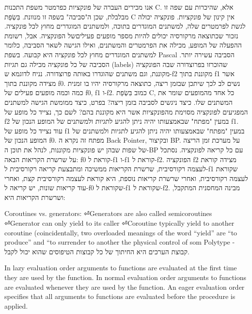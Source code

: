 \begin{טבלא}[!htbp]
        אנו מכירים העברה של פונקציות כפרמטר משפת התכנות C. אלא, שהיכרות עם שפה זו
        מבלבלת, שכן ה"סביבה" בשפה זו מנוונת. בִּשְׂפַת C אין קינון של פונקציות. פונקציה
        יכולה לגשת לפרמטרים שלה, למשתנים המוגדרים בתוכה, ולמשתנים המוגדרים מחוץ לכל
        פונקציה. נזכור שכתוצאה מרקורסיה יכולים להיות מספר מופעים פעיליםשל הפונקציה.
        אבל, רשומת ההפעלה של המופע, מכילה את הפרמטרים והמשתנים, ואילו הגישה לשאר
        הסביבה, כלומר למשתנים המוגדרים מחוץ לכל פונקציה היא קבועה. בשפת Pascal הסביבה
        עשירה יותר. הסביבה של כל פונקציה מכילה גם תגיות (labels) שהוכרזו בפרוצדורה שבה
        הפונקציה מקוננת, וגם משתנים שהוגדרו באותה פרוצדורה. נניח לדוגמא ש-f2 מקוננת
        בתוך f1 אשר מצידה מקוננת בתוך f0. נשים לב לכך שיתכן שבזמן ריצה, כתוצאה מרקורסיה
        יהיו בו זמנית כמה וכמה מופעים פעילים של f0, f1 ו-f2. כמוב בִּשְׂפַת C, כל אחד
        מהמופעים שומר את המשתנים שלו.
        כיצד ניגשים לסביבה בזמן ריצה? בפרט, כיצד ממומשת הגישה למשתנים המפגיעים לפונקציה מסוימת מהפונקציות אשר היא מקוננת בהם? לשם כך, נצייד כל מופע של f2 במעין "מפתח" שבאמצעותו יהיה ניתן להגיע לתגיות ולמשתנים של המופע הנכון של f1. עוד נצייד כל מופע של f1 במעין "מפתח" שבאמצעותו יהיה ניתן להגיע לתגיות ולמשתנים של המופע הנכון של f0.
        מפתח זה נקרא ה Back Pointer, ובקיצור BP. על מערכת זמן הריצה של שפות שבהן יש פונקציות מקוננות, לנהל את תוכן ה-BP עם כל קריאה לפונקציה.
        נסתכל על שרשרת הקריאות הבאה: f0 קוראת ל-f1 ו-f1 קוראת ל-f2. הפונקציה f2 מצידה קוראת לעצמה רקורסיבית, שרשרת הקריאות ממשיכה ומתבצעת קריאה רקורסיבית ל-f1 שקוראת לעצמה רקורסיבית, ואחרי שרשרת קריאות נוספת, היא קוראת לעצמה רקורסיבית קצת, ואחרי עוד קריאות שונות, יש קריאה ל-f0 שקוראת ל-f1 שקוראת ל-f2.
        מבינה המחסנית המתקבל, ושרשרת הקריאות היא:

        Coroutines vs. generators:
⏎Generators are also called semicoroutines
⏎Generator can only yield to its caller
⏎Coroutine typically yield to another coroutine (coincidentally, two overloaded meanings of the word “yield” are “to produce” and “to surrender to another the physical control of som
        Polytype - קבוצת הערכים היא החיתוך של כל קבוצות הטיפוסים שהוא יכול לקבל.

        In lazy evaluation order arguments to functions are
        evaluated at the first time they are used by the function.
        In normal evaluation order arguments to functions are
        evaluated whenever they are used by the function.
        An eager evaluation order specifies that all arguments
        to functions are evaluated before the procedure is applied.


\end{טבלא}
